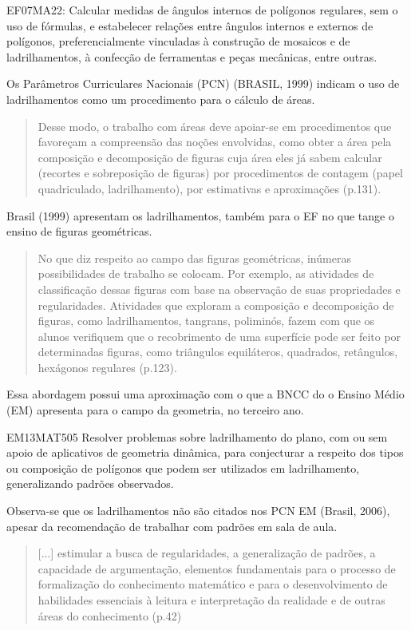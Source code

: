 \begin{apresentacao}
\begin{habilities}{EF07MA22}: Calcular medidas de ângulos internos de polígonos regulares, sem o uso de fórmulas, e estabelecer relações entre ângulos internos e externos de polígonos, preferencialmente vinculadas à construção de mosaicos e de ladrilhamentos, à confecção de ferramentas e peças mecânicas, entre outras. 
\end{habilities}

Os Parâmetros Curriculares Nacionais (PCN) (BRASIL, 1999) indicam o uso de ladrilhamentos como um procedimento para o cálculo de áreas.
\begin{quote}
Desse modo, o trabalho com áreas deve apoiar-se em procedimentos que favoreçam a compreensão das noções envolvidas, como obter a área pela composição e decomposição de figuras cuja área eles já sabem calcular (recortes e sobreposição de figuras) por procedimentos de contagem (papel quadriculado, ladrilhamento), por estimativas e aproximações (p.131).
\end{quote}

Brasil (1999) apresentam os ladrilhamentos, também para o EF no que tange o ensino de figuras geométricas.
\begin{quote}
No que diz respeito ao campo das figuras geométricas, inúmeras possibilidades de trabalho se colocam. Por exemplo, as atividades de classificação dessas figuras com base na observação de suas propriedades e regularidades. Atividades que exploram a composição e decomposição de figuras, como ladrilhamentos, tangrans, poliminós, fazem com que os alunos verifiquem que o recobrimento de uma superfície pode ser feito por determinadas figuras, como triângulos equiláteros, quadrados, retângulos, hexágonos regulares (p.123).
\end{quote}

Essa abordagem possui uma aproximação com o que a BNCC do o Ensino Médio (EM) apresenta para o campo da geometria, no terceiro ano.


\begin{habilities}{EM13MAT505} 
Resolver problemas sobre ladrilhamento do plano, com ou sem apoio de aplicativos de geometria dinâmica, para conjecturar a respeito dos tipos ou composição de polígonos que podem ser utilizados em ladrilhamento, generalizando padrões observados.
\end{habilities}

Observa-se que os ladrilhamentos não são citados nos PCN EM (Brasil, 2006), apesar da recomendação de trabalhar com padrões em sala de aula. 
\begin{quote}
[...] estimular a busca de regularidades, a generalização de padrões, a capacidade de argumentação, elementos fundamentais para o processo de formalização do conhecimento matemático e para o desenvolvimento de habilidades essenciais à leitura e interpretação da realidade e de outras áreas do conhecimento (p.42)
\end{quote}


\end{apresentacao}
